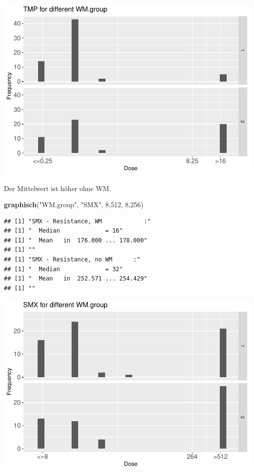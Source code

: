 \documentclass[
]{article}
\newenvironment{Shaded}{\begin{snugshade}}{\end{snugshade}}
\newcommand{\DecValTok}[1]{\textcolor[rgb]{0.00,0.00,0.81}{#1}}
\newcommand{\KeywordTok}[1]{\textcolor[rgb]{0.13,0.29,0.53}{\textbf{#1}}}
\newcommand{\NormalTok}[1]{#1}
\newcommand{\StringTok}[1]{\textcolor[rgb]{0.31,0.60,0.02}{#1}}
\begin{document}
\includegraphics{Verteilungen_files/figure-latex/unnamed-chunk-42-1.pdf}

Der Mittelwert ist höher ohne WM.

\begin{Shaded}
\begin{Highlighting}[]
  \KeywordTok{graphisch}\NormalTok{(}\StringTok{"WM.group"}\NormalTok{, }\StringTok{"SMX"}\NormalTok{, }\DecValTok{8}\NormalTok{,}\DecValTok{512}\NormalTok{, }\DecValTok{8}\NormalTok{,}\DecValTok{256}\NormalTok{) }
\end{Highlighting}
\end{Shaded}

\begin{verbatim}
## [1] "SMX - Resistance, WM            :"
## [1] "  Median             = 16"
## [1] "  Mean   in  176.000 ... 178.000"
## [1] ""
## [1] "SMX - Resistance, no WM      :"
## [1] "  Median             = 32"
## [1] "  Mean   in  252.571 ... 254.429"
## [1] ""
\end{verbatim}

\includegraphics{Verteilungen_files/figure-latex/unnamed-chunk-43-1.pdf}
\end{document}
